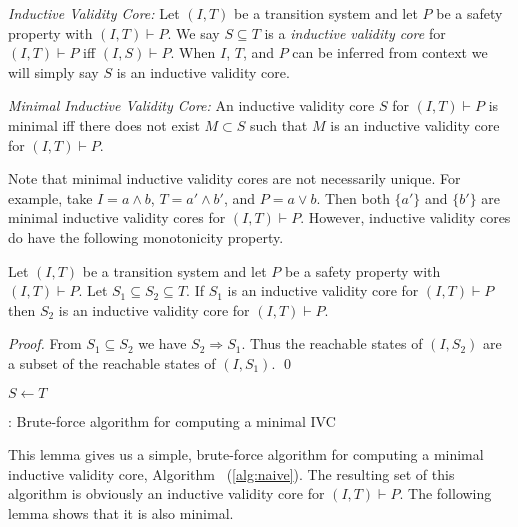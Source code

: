 \begin{definition}{\emph{Inductive Validity Core:}}
  \label{def:ivc}
  Let $(I, T)$ be a transition system and let $P$ be a
  safety property with $(I, T)\vdash P$. We say $S \subseteq
  T$ is a {\em inductive validity core} for $(I, T)\vdash P$ iff $(I,
  S) \vdash P$. When $I$, $T$, and $P$ can be inferred from
  context we will simply say $S$ is an inductive validity core.
\end{definition}

\begin{definition}{\emph{Minimal Inductive Validity Core:}}
  \label{def:minimal-ivc}
  An inductive validity core $S$ for $(I, T)\vdash P$ is minimal iff
  there does not exist $M \subset S$ such that $M$ is an inductive validity core
  for $(I, T)\vdash P$.
\end{definition}

Note that minimal inductive validity cores are not necessarily unique.
For example, take $I = a \land b$, $T = a' \land b'$, and $P = a \lor
b$. Then both $\{a'\}$ and $\{b'\}$ are minimal inductive validity
cores for $(I, T)\vdash P$. However, inductive validity cores do have
the following monotonicity property.

\begin{lemma}
  \label{lem:ivc-monotonic}
  Let $(I, T)$ be a transition system and let $P$ be a safety property
  with $(I, T)\vdash P$. Let $S_1 \subseteq S_2 \subseteq T$. If $S_1$
  is an inductive validity core for $(I, T)\vdash P$ then $S_2$ is an
  inductive validity core for $(I, T)\vdash P$.
\end{lemma}
\begin{proof}
  From $S_1 \subseteq S_2$ we have $S_2 \Rightarrow S_1$. Thus the
  reachable states of $(I, S_2)$ are a subset of the reachable states
  of $(I, S_1)$. \qed
\end{proof}

\begin{algorithm}[t]
  \BlankLine
  $S \leftarrow T$ \\
   {
  }
\caption{\bfalg: Brute-force algorithm for computing a minimal IVC}
\label{alg:naive}
\end{algorithm}

This lemma gives us a simple, brute-force algorithm for computing
a minimal inductive validity core, Algorithm \bfalg~(\ref{alg:naive}). The
resulting set of this algorithm is obviously an inductive validity
core for $(I, T)\vdash P$. The following lemma shows that it is also
minimal.

